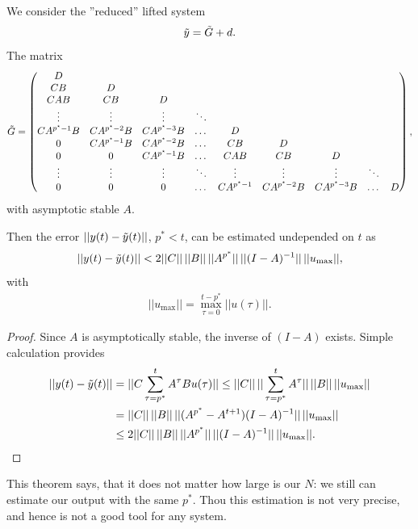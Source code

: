 	\begin{theo}
	We consider the ''reduced'' lifted system 
	\begin{align}
	\tilde{y} = \tilde{G} + d.
	\end{align}
	The matrix 
	\begin{align}
	\tilde{G} = \begin{pmatrix}
	D  \\
	CB & D \\
	C A B & CB & D\\
	\vdots & \vdots & \vdots & \ddots \\
	C A^{p^\star-1} B & C A^{p^\star-2}B & C A^{p^\star-3}B &\dots& D \\
	0           & C A^{p^\star-1} B & C A^{p^\star-2} B & \dots & CB & D\\
	0 & 0 & C A^{p^\star-1} B & \dots & CAB & CB & D \\
	\vdots & \vdots & \vdots & \ddots & \vdots & \vdots & \vdots & \ddots \\
	0 & 0 & 0 & \dots & C A^{p^\star-1}& C A^{p^\star-2}B& CA^{p^\star-3}B &\dots & D
	\end{pmatrix},
	\end{align}
	with asymptotic stable $A$.
	
	Then the error $||y(t) - \tilde{y}(t)||$, $p^* < t$, can be estimated undepended on $t$ as 
	\begin{align}
	||y(t) - \tilde{y}(t)|| < 2 ||C|| \, ||B|| \,  ||A^{p^*}||\, ||(I - A)^{-1}||\,||u_{\max}||, 
	\end{align}
	with 
	\begin{align}
	||u_{\max}|| = \max_{\tau = 0}^{t - p^*} ||u(\tau)||. 
	\end{align}

	\end{theo}	
	\begin{proof}
	Since $A$ is asymptotically stable, the inverse of $(I - A)$ exists. Simple calculation provides 
		\begin{align}
	\begin{split}
			||y(t) - \tilde{y}(t)|| &= ||C \sum_{\tau = p^*}^t A^\tau B u(\tau)|| \leq ||C|| \, ||\sum_{\tau = p^*}^t A^\tau || \,||B|| \, ||u_{\max}|| \\
			& = ||C|| \, ||B|| \, ||(A^{p^*} - A^{t + 1})(I - A)^{-1}|| \, ||u_{\max}|| \\
			&  \leq 2 ||C|| \, ||B|| \, ||A^{p^*}|| \, ||(I - A)^{-1}|| \, ||u_{\max}||. 
	\end{split}
		\end{align}
	\end{proof}

	This theorem says, that it does not matter how large is our $N$: we still can estimate our output with the same $p^*$. 
	Thou this estimation is not very precise, and hence is not a good tool for any system. 
	
	
	
	
	
	
	
	